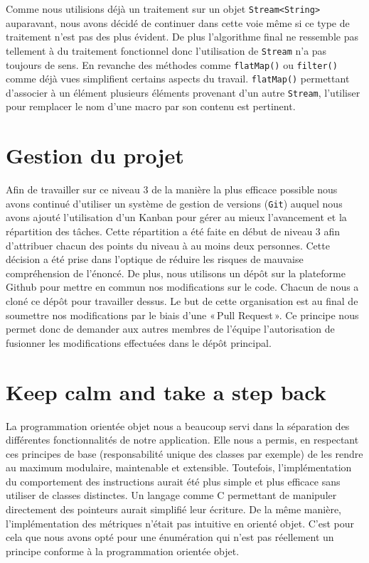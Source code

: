 \documentclass{article}
\begin{document}
    Comme nous utilisions déjà un traitement sur un objet \texttt{Stream<String>} auparavant, nous avons décidé de continuer dans cette voie même si ce type de traitement n'est pas des plus évident. De plus l'algorithme final ne ressemble pas tellement à du traitement fonctionnel donc l'utilisation de \texttt{Stream} n'a pas toujours de sens. En revanche des méthodes comme \texttt{flatMap()} ou \texttt{filter()} comme déjà vues simplifient certains aspects du travail. \texttt{flatMap()} permettant d'associer à un élément plusieurs éléments provenant d'un autre \texttt{Stream}, l'utiliser pour remplacer le nom d'une macro par son contenu est pertinent.


\section{Gestion du projet}


Afin de travailler sur ce niveau 3 de la manière la plus efficace possible nous avons continué d'utiliser un système de gestion de versions (\texttt{Git}) auquel nous avons ajouté l'utilisation d'un Kanban pour gérer au mieux l'avancement et la répartition des tâches. Cette répartition a été faite en début de niveau 3 afin d'attribuer chacun des points du niveau à au moins deux personnes. Cette décision a été prise dans l'optique de réduire les risques de mauvaise compréhension de l'énoncé.
De plus, nous utilisons un dépôt sur la plateforme Github pour mettre en commun nos modifications sur le code. Chacun de nous a cloné ce dépôt pour travailler dessus. Le but de cette organisation est au final de soumettre nos modifications par le biais d'une « Pull Request ». Ce principe nous permet donc de demander aux autres membres de l'équipe l'autorisation de fusionner les modifications effectuées dans le dépôt principal.

\section{Keep calm and take a step back}

La programmation orientée objet nous a beaucoup servi dans la séparation des différentes fonctionnalités de notre application. Elle nous a permis, en respectant ces principes de base (responsabilité unique des classes par exemple) de les rendre au maximum modulaire, maintenable et extensible. Toutefois, l'implémentation du comportement des instructions aurait été plus simple et plus efficace sans utiliser de classes distinctes. Un langage comme C permettant de manipuler directement des pointeurs aurait simplifié leur écriture. De la même manière, l'implémentation des métriques n'était pas intuitive en orienté objet. C'est pour cela que nous avons opté pour une énumération qui n'est pas réellement un principe conforme à la programmation orientée objet.
\end{document}

